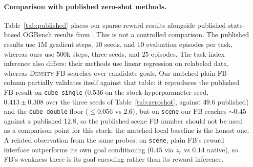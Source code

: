 \documentclass{article}
\newcommand{\DensityFB}{\textsc{Density-FB}}
\begin{document}
\paragraph{Comparison with published zero-shot methods.}
Table~\ref{tab:published} places our sparse-reward results alongside published state-based OGBench results from \citet{bagatella-iclr26a}.
This is not a controlled comparison.
The published results use $1$M gradient steps, $10$ seeds, and $10$ evaluation episodes per task, whereas ours use $500$k steps, three seeds, and $25$ episodes.
The task-index inference also differs: their methods use linear regression on relabeled data, whereas \DensityFB{} searches over candidate goals.
Our matched plain-FB column partially validates itself against that table: it reproduces the published FB result on \texttt{cube-single} ($0.536$ on the stock-hyperparameter seed, $0.413 \pm 0.308$ over the three seeds of Table~\ref{tab:zeroshot}, against $49.6$ published) and the \texttt{cube-double} floor (${\le}0.056$ vs $2.6$), but on \texttt{scene} our FB reaches ${\sim}0.45$ against a published $12.8$, so the published scene FB number should not be used as a comparison point for this stack; the matched local baseline is the honest one.
A related observation from the same probes: on \texttt{scene}, plain FB's reward interface outperforms its own goal conditioning ($0.45$ via $z_r$ vs $0.14$ native), so FB's weakness there is its goal encoding rather than its reward inference.
\end{document}
